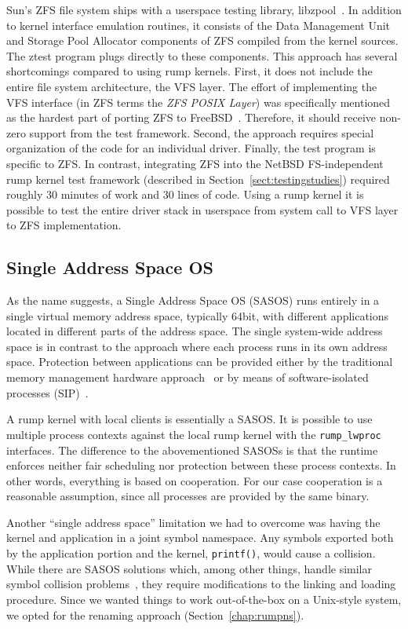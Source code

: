 Sun's ZFS file system ships with a userspace testing library,
libzpool~\cite{zfs_source_tour}.  In addition to kernel interface
emulation routines, it consists of the Data Management Unit and
Storage Pool Allocator components of ZFS compiled from the kernel
sources.  The ztest program plugs directly to these components.
This approach has several shortcomings compared to using rump
kernels.  First, it does not include the entire file system
architecture, \eg the VFS layer.  The effort of implementing the
VFS interface (in ZFS terms the \textit{ZFS POSIX Layer}) was
specifically mentioned as the hardest part of porting ZFS to
FreeBSD~\cite{pjd:zfs}.  Therefore, it should receive non-zero
support from the test framework.  Second, the approach requires special organization
of the code for an individual driver.  Finally, the
test program is specific to ZFS.  In contrast, integrating ZFS into
the NetBSD FS-independent rump kernel test framework (described in
Section~\ref{sect:testingstudies}) required roughly 30 minutes of
work and 30 lines of code.
Using a rump kernel it is possible to test the entire driver
stack in userspace from system call to VFS layer to ZFS implementation.

\subsection{Single Address Space OS}

As the name suggests, a Single Address Space OS (SASOS) runs entirely
in a single virtual memory address space, typically 64bit, with
different applications located in different parts of the address
space.  The single system-wide address space is in contrast to the approach where each process runs
in its own address space.  Protection between applications can
be provided either by the traditional memory management
hardware approach~\cite{chase:sasosprot,heiser:mungi} or by means
of software-isolated processes (SIP)~\cite{hunt:singularity}.

A rump kernel with local clients is essentially a SASOS.  It is
possible to use multiple process contexts against the local rump
kernel with the \verb+rump_lwproc+ interfaces.  The difference to
the abovementioned SASOSs is that the runtime enforces neither fair
scheduling nor protection between these process contexts.  In other
words, everything is based on cooperation.  For our case cooperation is
a reasonable assumption, since all processes are provided by the
same binary.

Another ``single address space'' limitation we had to overcome was
having the kernel and application in a joint symbol namespace.
Any symbols exported both by the application portion
and the kernel, \eg \verb+printf()+, would cause a collision.
While there are SASOS solutions which, among other things, handle
similar symbol collision problems~\cite{deller:sasoslink}, they
require modifications to the linking and loading procedure.  Since
we wanted things to work out-of-the-box on a Unix-style system, we
opted for the renaming approach (Section~\ref{chap:rumpns}).
